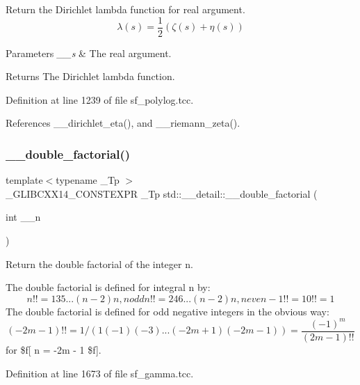 Return the Dirichlet lambda function for real argument. \[ \lambda(s) = \frac{1}{2}(\zeta(s) + \eta(s)) \]


\begin{DoxyParams}{Parameters}
{\em \+\_\+\+\_\+s} & The real argument. \\
\hline
\end{DoxyParams}
\begin{DoxyReturn}{Returns}
The Dirichlet lambda function. 
\end{DoxyReturn}


Definition at line 1239 of file sf\+\_\+polylog.\+tcc.



References \+\_\+\+\_\+dirichlet\+\_\+eta(), and \+\_\+\+\_\+riemann\+\_\+zeta().

\mbox{\label{namespacestd_1_1____detail_a06b0d9786afff0919c96f61d5f760c5f}} 
\subsubsection{\texorpdfstring{\+\_\+\+\_\+double\+\_\+factorial()}{\_\_double\_factorial()}}
{\footnotesize\ttfamily template$<$typename \+\_\+\+Tp $>$ \\
\+\_\+\+G\+L\+I\+B\+C\+X\+X14\+\_\+\+C\+O\+N\+S\+T\+E\+X\+PR \+\_\+\+Tp std\+::\+\_\+\+\_\+detail\+::\+\_\+\+\_\+double\+\_\+factorial (\begin{DoxyParamCaption}\item[{int}]{\+\_\+\+\_\+n }\end{DoxyParamCaption})}



Return the double factorial of the integer n. 

The double factorial is defined for integral n by\+: \[ n!! = 1 3 5 ... (n-2) n, n odd n!! = 2 4 6 ... (n-2) n, n even -1!! = 1 0!! = 1 \] The double factorial is defined for odd negative integers in the obvious way\+: \[ (-2m - 1)!! = 1 / (1 (-1) (-3) ... (-2m + 1) (-2m - 1)) = \frac{(-1)^m}{(2m-1)!!} \] for \$f\mbox{[} n = -\/2m -\/ 1 \$f\mbox{]}. 

Definition at line 1673 of file sf\+\_\+gamma.\+tcc.



